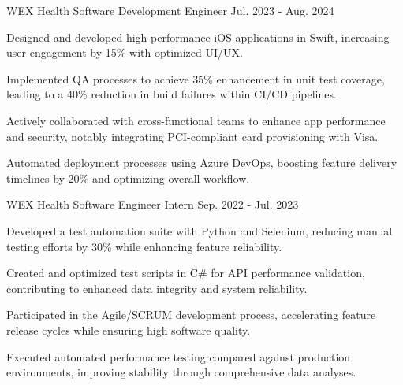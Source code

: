 


\begin{cventries}

  \cventry
    {WEX Health} %
    {Software Development Engineer} %
    {} %
    {Jul. 2023 - Aug. 2024} %
    {
      \begin{cvitems} %
      \item {Designed and developed high-performance iOS applications in Swift, increasing user engagement by 15\% with optimized UI/UX.}
    \item {Implemented QA processes to achieve 35\% enhancement in unit test coverage, leading to a 40\% reduction in build failures within CI/CD pipelines.}
    \item {Actively collaborated with cross-functional teams to enhance app performance and security, notably integrating PCI-compliant card provisioning with Visa.}
    \item {Automated deployment processes using Azure DevOps, boosting feature delivery timelines by 20\% and optimizing overall workflow.}
      \end{cvitems}
    }

  \cventry
    {WEX Health} %
    {Software Engineer Intern} %
    {} %
    {Sep. 2022 - Jul. 2023} %
    {
      \begin{cvitems} %
      \item {Developed a test automation suite with Python and Selenium, reducing manual testing efforts by 30\% while enhancing feature reliability.}
    \item {Created and optimized test scripts in C\# for API performance validation, contributing to enhanced data integrity and system reliability.}
    \item {Participated in the Agile/SCRUM development process, accelerating feature release cycles while ensuring high software quality.}
    \item {Executed automated performance testing compared against production environments, improving stability through comprehensive data analyses.}
      \end{cvitems}
    }


\end{cventries}
